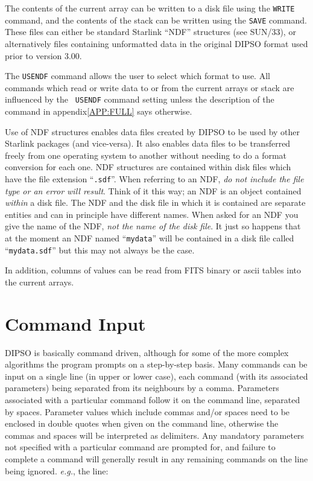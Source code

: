 \documentclass[twoside,11pt]{article}
\newcommand{\hyperref}[4]{#2\ref{#4}#3}
\newcommand{\htmlref}[2]{#1}
\newcommand{\xref}[3]{#1}
\renewcommand{\_}{\texttt{\symbol{95}}}
\begin{document}
The contents of the current array can be written to a disk file using the
\htmlref{{\tt{WRITE}}}{COM:WRITE}  command, and the contents of the stack
can be written using the \htmlref{{\tt{SAVE}}}{COM:SAVE}  command. These
files can either be standard Starlink ``NDF'' structures (see
\xref{SUN/33}{sun33}{}), or alternatively files containing unformatted data
in the original DIPSO format used prior to version 3.00.

The \htmlref{{\tt{USENDF}}}{COM:USENDF}  command allows the user to select
which format to use. All commands which read or write data to or from the
current arrays or stack are influenced by the \htmlref{{\tt
USENDF}}{COM:USENDF} command setting unless the \hyperref{description of the
command}{description of the command in appendix}{}{APP:FULL} says otherwise.

Use of NDF structures enables data files created by DIPSO to be used by
other Starlink packages (and vice-versa). It also enables data files to
be transferred freely from one operating system to another without
needing to do a format conversion for each one. NDF structures are
contained within disk files which have the file extension ``{\tt{.sdf}}''. 
When referring to an NDF, {\em do not include the file type or an error
will result}. Think of it this way; an NDF is an object contained {\em
within} a disk file. The NDF and the disk file in which it is contained
are separate entities and can in principle have different names. When
asked for an NDF you give the name of the NDF, {\em not the name of the
disk file}. It just so happens that at the moment an NDF named
``{\tt{my\_data}}''  will be contained in a disk file called
``{\tt{my\_data.sdf}}''  but this may not always be the case.

In addition, columns of values can be read from FITS binary or ascii
tables into the current arrays.

\section {Command Input}

DIPSO is basically command driven, although for some of the more
complex algorithms the program prompts on a step-by-step basis. Many
commands can be input on a single line (in upper or lower case), each
command (with its associated parameters) being separated from its
neighbours by a comma. Parameters associated with a particular command
follow it on the command line, separated by spaces. Parameter values
which include commas and/or spaces need to be enclosed in double quotes
when given on the command line, otherwise the commas and spaces will be
interpreted as delimiters. Any mandatory
parameters not specified with a particular command are prompted for,
and failure to complete a command will generally result in any
remaining commands on the line being ignored. {\em e.g.}, the line:
\end{document}
